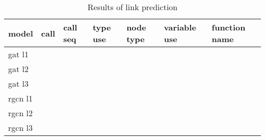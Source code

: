 \documentclass[a4paper,twoside]{article}
\begin{document}
\begin{table*}[]
\centering
\label{tbl:results}
\caption{Results of link prediction}
\begin{tabular}{lllllll}
model   & call & call seq & type use & node type & variable use & function name \\ \hline
gat l1  &      &          &          &           &              &               \\
gat l2  &      &          &          &           &              &               \\
gat l3  &      &          &          &           &              &               \\
rgcn l1 &      &          &          &           &              &               \\
rgcn l2 &      &          &          &           &              &               \\
rgcn l3 &      &          &          &           &              &              
\end{tabular}
\end{table*}



{\small
}
\end{document}

